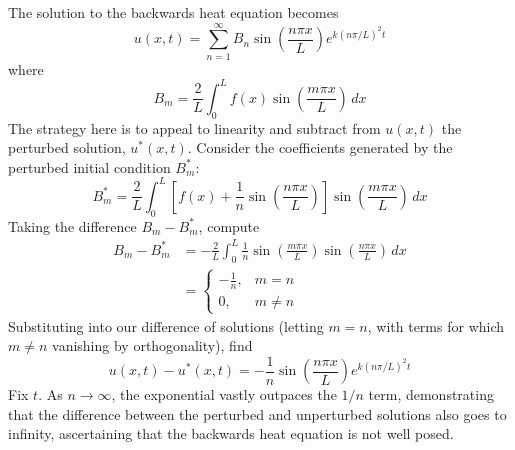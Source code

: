 \documentclass[a4paper]{article}
\begin{document}
The solution to the backwards heat equation becomes
\[
	u \!\left( x,t \right) = \sum^{\infty}_{n=1} B_{n}\sin\!\left(\frac{n \pi x}{L}\right)e^{k \!\left( n \pi / L \right)^{2}t} 
\]
where
\[
	B_{m} = \frac{2}{L}\int^{L}_{0} f \!\left( x \right)\sin\!\left(\frac{m \pi x}{L}\right) \, dx
\]
The strategy here is to appeal to linearity and subtract from \( u \!\left( x,t \right) \) the perturbed solution, \( u^{*}\!\left( x,t \right) \). Consider the coefficients generated by the perturbed initial condition \( B^{*}_{m} \):
\[
	B^{*}_{m} = \frac{2}{L}\int^{L}_{0} \!\left[ f \!\left( x \right) + \frac{1}{n}\sin\!\left(\frac{n \pi x}{L}\right) \right]\sin\!\left(\frac{m \pi x}{L}\right) \, dx  
\]
Taking the difference \( B_{m} - B^{*}_{m} \), compute
\begin{align*}
	B_{m} - B^{*}_{m} & = -\frac{2}{L}\int^{L}_{0} \frac{1}{n}\sin\!\left(\frac{m \pi x}{L}\right)\sin\!\left(\frac{n \pi x}{L}\right) \, dx \\
	 & = \begin{cases}
		 -\displaystyle{\frac{1}{n}}, & m = n \\
	 	0, & m \neq n 
	 \end{cases}
\end{align*}
Substituting into our difference of solutions (letting \( m = n \), with terms for which \( m \neq n \) vanishing by orthogonality), find
\[
	u \!\left( x,t \right) - u^{*}\!\left( x,t \right) = -\frac{1}{n}\sin\!\left(\frac{n \pi x}{L}\right)e^{k \!\left( n \pi / L \right)^{2}t} 
\]
Fix \( t \). As \( n \rightarrow \infty \), the exponential vastly outpaces the \( 1 / n \) term, demonstrating that the difference between the perturbed and unperturbed solutions also goes to infinity, ascertaining that the backwards heat equation is not well posed.

\vspace{12pt}
\end{document}
